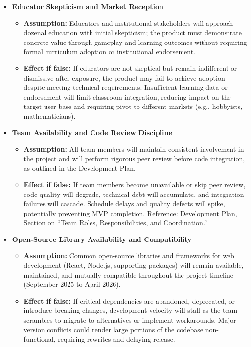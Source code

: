 \documentclass[12pt]{article}
\begin{document}
\begin{itemize}
    \item \textbf{Educator Skepticism and Market Reception}
    \begin{itemize}
        \item \textbf{Assumption:} Educators and institutional stakeholders will approach dozenal education with initial skepticism; the product must demonstrate concrete value through gameplay and learning outcomes without requiring formal curriculum adoption or institutional endorsement.
        \item \textbf{Effect if false:} If educators are not skeptical but remain indifferent or dismissive after exposure, the product may fail to achieve adoption despite meeting technical requirements. Insufficient learning data or endorsement will limit classroom integration, reducing impact on the target user base and requiring pivot to different markets (e.g., hobbyists, mathematicians).
    \end{itemize}
    
    \item \textbf{Team Availability and Code Review Discipline}
    \begin{itemize}
        \item \textbf{Assumption:} All team members will maintain consistent involvement in the project and will perform rigorous peer review before code integration, as outlined in the Development Plan.
        \item \textbf{Effect if false:} If team members become unavailable or skip peer review, code quality will degrade, technical debt will accumulate, and integration failures will cascade. Schedule delays and quality defects will spike, potentially preventing MVP completion. Reference: Development Plan, Section on ``Team Roles, Responsibilities, and Coordination.''
    \end{itemize}
    
    \item \textbf{Open-Source Library Availability and Compatibility}
    \begin{itemize}
        \item \textbf{Assumption:} Common open-source libraries and frameworks for web development (React, Node.js, supporting packages) will remain available, maintained, and mutually compatible throughout the project timeline (September 2025 to April 2026).
        \item \textbf{Effect if false:} If critical dependencies are abandoned, deprecated, or introduce breaking changes, development velocity will stall as the team scrambles to migrate to alternatives or implement workarounds. Major version conflicts could render large portions of the codebase non-functional, requiring rewrites and delaying release.
    \end{itemize}
\end{itemize}
\end{document}
